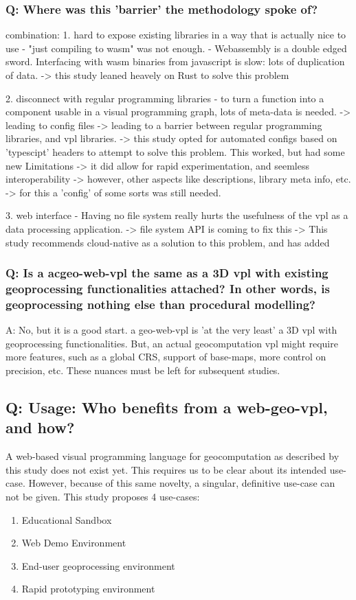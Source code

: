 
\subsubsection*{Q: Where was this 'barrier' the methodology spoke of?}

combination: 
1. hard to expose existing libraries in a way that is actually nice to use
- "just compiling to wasm" was not enough.
- Webassembly is a double edged sword. Interfacing with wasm binaries from javascript is slow: lots of duplication of data. 
-> this study leaned heavely on Rust to solve this problem

2. disconnect with regular programming libraries
- to turn a function into a component usable in a visual programming graph, lots of meta-data is needed. 
  -> leading to config files 
  -> leading to a barrier between regular programming libraries, and vpl libraries. 
  -> this study opted for automated configs based on 'typescipt' headers to attempt to solve this problem. This worked, but had some new Limitations
     -> it did allow for rapid experimentation, and seemless interoperability
     -> however, other aspects like descriptions, library meta info, etc. 
     -> for this a 'config' of some sorts was still needed. 

3. web interface
- Having no file system really hurts the usefulness of the vpl as a data processing application.
-> file system API is coming to fix this
-> This study recommends cloud-native as a solution to this problem, and has added 

\subsubsection*{Q: Is a ac{geo-web-vpl} the same as a 3D vpl with existing geoprocessing functionalities attached? In other words, is geoprocessing nothing else than procedural modelling?}

A: No, but it is a good start. a geo-web-vpl is 'at the very least' a 3D vpl with geoprocessing functionalities. 
But, an actual geocomputation vpl might require more features, such as a global CRS, support of base-maps, more control on precision, etc. 
These nuances must be left for subsequent studies. 

\subsection{Q: Usage: Who benefits from a web-geo-vpl, and how? }
A web-based visual programming language for geocomputation as described by this study does not exist yet. 
This requires us to be clear about its intended use-case. 
However, because of this same novelty, a singular, definitive use-case can not be given.
This study proposes 4 use-cases:
\begin{enumerate}[-]
  \item Educational Sandbox
  \item Web Demo Environment
  \item End-user geoprocessing environment 
  \item Rapid prototyping environment
\end{enumerate}

